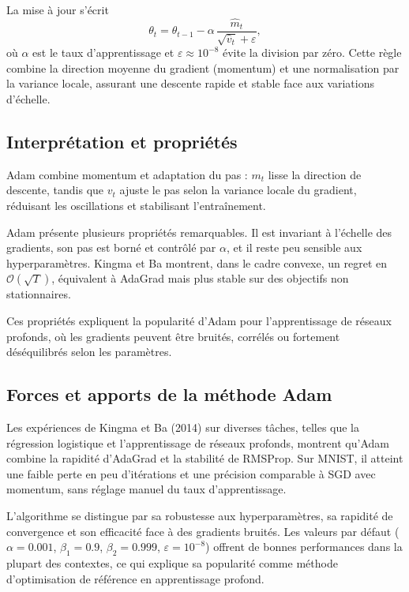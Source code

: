 \documentclass[a4paper,12pt]{article}
\begin{document}
La mise à jour s’écrit
\[
\theta_t = \theta_{t-1} - \alpha\,\frac{\hat{m}_t}{\sqrt{\hat{v}_t}+\varepsilon},
\]
où $\alpha$ est le taux d’apprentissage et $\varepsilon\approx10^{-8}$ évite la division par zéro.
Cette règle combine la direction moyenne du gradient (momentum) et une
normalisation par la variance locale, assurant une descente rapide et
stable face aux variations d’échelle.

\subsection{Interprétation et propriétés}

Adam combine momentum et adaptation du pas : $m_t$ lisse la direction de
descente, tandis que $v_t$ ajuste le pas selon la variance locale du
gradient, réduisant les oscillations et stabilisant l’entraînement.

Adam présente plusieurs propriétés remarquables. Il est invariant à
l’échelle des gradients, son pas est borné et contrôlé par $\alpha$, et
il reste peu sensible aux hyperparamètres. Kingma et Ba montrent, dans
le cadre convexe, un regret en $\mathcal{O}(\sqrt{T})$, équivalent à
AdaGrad mais plus stable sur des objectifs non stationnaires.

Ces propriétés expliquent la popularité d’Adam pour l’apprentissage de
réseaux profonds, où les gradients peuvent être bruités, corrélés ou
fortement déséquilibrés selon les paramètres.

\subsection{Forces et apports de la méthode Adam}

Les expériences de Kingma et Ba (2014) sur diverses tâches, telles que
la régression logistique et l’apprentissage de réseaux profonds,
montrent qu’Adam combine la rapidité d’AdaGrad et la stabilité
de RMSProp. Sur MNIST, il atteint une faible perte en peu d’itérations
et une précision comparable à SGD avec momentum, sans réglage manuel du
taux d’apprentissage.

L’algorithme se distingue par sa robustesse aux hyperparamètres, sa rapidité de convergence et son efficacité face à des gradients bruités. Les valeurs par défaut
($\alpha\!=\!0.001$, $\beta_1\!=\!0.9$, $\beta_2\!=\!0.999$,
$\varepsilon\!=\!10^{-8}$) offrent de bonnes performances dans la
plupart des contextes, ce qui explique sa popularité comme méthode
d’optimisation de référence en apprentissage profond.
\end{document}
